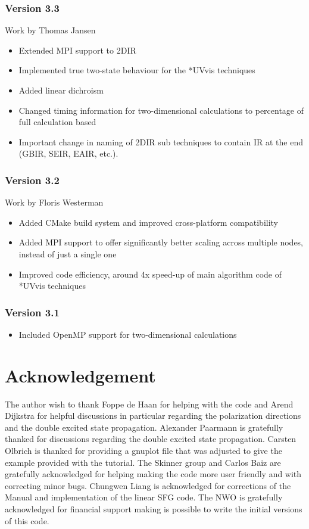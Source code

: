 \documentclass[12pt]{book}
\begin{document}
\subsection{Version 3.3}
{\small Work by Thomas Jansen}
\begin{itemize}
\item Extended MPI support to 2DIR
\item Implemented true two-state behaviour for the *UVvis techniques
\item Added linear dichroism
\item Changed timing information for two-dimensional calculations to percentage of full calculation based
\item Important change in naming of 2DIR sub techniques to contain IR at the end (GBIR, SEIR, EAIR, etc.).
\end{itemize}
	\subsection{Version 3.2}
{\small Work by Floris Westerman}
\begin{itemize}
\item Added CMake build system and improved cross-platform compatibility
\item Added MPI support to offer significantly better scaling across multiple nodes, instead of just a single one
\item Improved code efficiency, around 4x speed-up of main algorithm code of *UVvis techniques
\end{itemize}

\subsection{Version 3.1}
\begin{itemize}
\item Included OpenMP support for two-dimensional calculations
\end{itemize}









\chapter{Acknowledgement}
The author wish to thank Foppe de Haan for helping with the code and Arend Dijkstra for 
helpful discussions in particular regarding the polarization directions and the double excited 
state propagation. Alexander Paarmann is gratefully thanked for discussions regarding the 
double excited state propagation. Carsten Olbrich is thanked for providing a gnuplot file 
that was adjusted to give the example provided with the tutorial. The Skinner group and 
Carlos Baiz are gratefully acknowledged for helping making the code more user friendly 
and with correcting minor bugs. Chungwen Liang is acknowledged for corrections of the 
Manual and implementation of the linear SFG code. The NWO is gratefully acknowledged
for financial support making is possible to write the initial versions of this code. 

\end{document}
